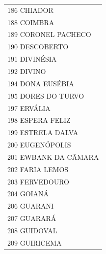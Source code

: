 \documentclass{article}
\begin{document}
\begin{longtable}[c]{m{18cm}}
\multicolumn{1}{l}{ \hspace{2em} 186 CHIADOR } \\
\multicolumn{1}{l}{ \hspace{2em} 188 COIMBRA } \\
\multicolumn{1}{l}{ \hspace{2em} 189 CORONEL PACHECO } \\
\multicolumn{1}{l}{ \hspace{2em} 190 DESCOBERTO } \\
\multicolumn{1}{l}{ \hspace{2em} 191 DIVINÉSIA } \\
\multicolumn{1}{l}{ \hspace{2em} 192 DIVINO } \\
\multicolumn{1}{l}{ \hspace{2em} 194 DONA EUSÉBIA } \\
\multicolumn{1}{l}{ \hspace{2em} 195 DORES DO TURVO } \\
\multicolumn{1}{l}{ \hspace{2em} 197 ERVÁLIA } \\
\multicolumn{1}{l}{ \hspace{2em} 198 ESPERA FELIZ } \\
\multicolumn{1}{l}{ \hspace{2em} 199 ESTRELA DALVA } \\
\multicolumn{1}{l}{ \hspace{2em} 200 EUGENÓPOLIS } \\
\multicolumn{1}{l}{ \hspace{2em} 201 EWBANK DA CÂMARA } \\
\multicolumn{1}{l}{ \hspace{2em} 202 FARIA LEMOS } \\
\multicolumn{1}{l}{ \hspace{2em} 203 FERVEDOURO } \\
\multicolumn{1}{l}{ \hspace{2em} 204 GOIANÁ } \\
\multicolumn{1}{l}{ \hspace{2em} 206 GUARANI } \\
\multicolumn{1}{l}{ \hspace{2em} 207 GUARARÁ } \\
\multicolumn{1}{l}{ \hspace{2em} 208 GUIDOVAL } \\
\multicolumn{1}{l}{ \hspace{2em} 209 GUIRICEMA } \\

\end{longtable}
\end{document}
